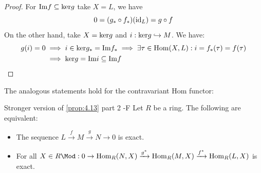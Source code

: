 \documentclass[twoside = false,	%
		headsepline,		%
		parskip = true,
		]{scrbook}						%
\begin{document}
\begin{proof}
        For $\mathrm{Im} f \subseteq \mathrm{ker} g$ take $X = L$, we have
        \begin{equation*}
            0 = (g_* \circ f_*)(\mathrm{id}_L) = g \circ f
        \end{equation*}
        On the other hand, take $X = \mathrm{ker} g$ and $i: \mathrm{ker} g \hookrightarrow M$. We have:
        \begin{equation*}
            \begin{split}
                g(i) = 0 &\implies i \in \mathrm{ker} g_* = \mathrm{Im} f_* \implies \exists \tau \in \mathrm{Hom}(X,L): i = f_*(\tau) = f(\tau) \\
                        &\implies \mathrm{ker} g = \mathrm{Im} i \subseteq \mathrm{Im} f
            \end{split}
        \end{equation*}
        \end{proof}
        
        The analogous statements hold for the contravariant Hom functor:
        \begin{proposition*}{Stronger version of \ref{prop:4.13} part 2 -F}
            Let $R$ be a ring. The following are equivalent:
            \begin{itemize}
                \item The sequence $L \xrightarrow{f} M \xrightarrow{g} N \to 0$ is exact.
                \item For all $X \in R \Mod: 0 \to \Hom_R(N,X) \xrightarrow{g^*} \Hom_R(M,X) \xrightarrow{f^*} \Hom_R(L,X)$ is exact.
            \end{itemize}
        \end{proposition*}
\end{document}
